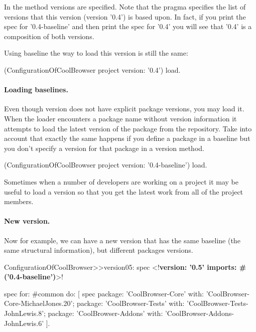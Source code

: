 \documentclass[a4paper,10pt,twoside]{book}
\begin{document}
In the method  versions are specified. Note that the pragma  specifies the list of versions that this version (version '0.4') is based upon. In fact, if you print the spec for '0.4-baseline' and then print the spec for '0.4' you will see that '0.4' is a composition of both versions.

Using baseline the way to load this version is still the same:
\begin{code}{}
(ConfigurationOfCoolBrowser project version: '0.4') load.
\end{code}


\paragraph{Loading baselines.}
Even though version  does not have explicit package versions, you may load it. When the loader encounters a package name without version information it attempts to load the latest version of the package from the repository. Take into account that exactly the same happens if you define a package in a baseline but you don't specify a version for that package in a version method. 
 
\begin{code}{}
(ConfigurationOfCoolBrowser project version: '0.4-baseline') load.
\end{code}

Sometimes when a number of developers are working on a project it may be useful to load a  version so that you get the latest work from all of the project members.


\paragraph{New version.}
Now for example, we can have a new version  that has the same baseline (the same structural information), but different packages versions. 

\begin{code}{} 
ConfigurationOfCoolBrowser>>version05: spec 
	<!\textbf{version: '0.5' imports: \#('0.4-baseline')}>!
	
	spec for: #common do: [
		spec 
			package: 'CoolBrowser-Core' with: 'CoolBrowser-Core-MichaelJones.20';
			package: 'CoolBrowser-Tests' with: 'CoolBrowser-Tests-JohnLewis.8';
			package: 'CoolBrowser-Addons' with: 'CoolBrowser-Addons-JohnLewis.6' ].
\end{code}
\end{document}
